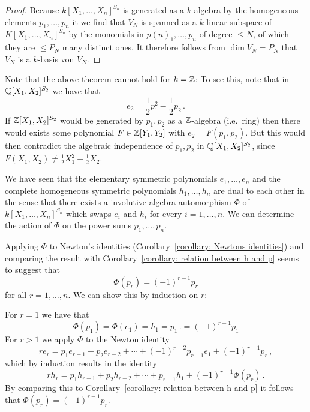 \begin{proof}
  Because $k[X_1, \dotsc, X_n]^{S_n}$ is generated as a $k$-algebra by the homogeneous elements $p_1, \dotsc, p_n$ it we find that $V_N$ is spanned as a $k$-linear subspace of $K[X_1, \dotsc, X_n]^{S_n}$ by the monomials in $p{(n)}_1, \dotsc, p_n$ of degree $\leq N$, of which they are $\leq P_N$ many distinct ones.
  It therefore follows from $\dim V_N = P_N$ that $V_N$ is a $k$-basis von $V_N$.
\end{proof}


\begin{remark}
  Note that the above theorem cannot hold for $k = \mathbb{Z}$:
  To see this, note that in $\mathbb{Q}[X_1, X_2]^{S_2}$ we have that
  \[
      e_2
    = \frac{1}{2}  p_1^2 - \frac{1}{2} p_2 \,.
  \]
  If $\mathbb{Z}[X_1, X_2]^{S_2}$ would be generated by $p_1, p_2$ as a $\mathbb{Z}$-algebra (i.e.\ ring) then there would exists some polynomial $F \in \mathbb{Z}[Y_1, Y_2]$ with $e_2 = F( p_1, p_2)$.
  But this would then contradict the algebraic independence of $p_1, p_2$ in $\mathbb{Q}[X_1, X_2]^{S_2}$, since $F(X_1, X_2) \neq \frac{1}{2} X_1^2 - \frac{1}{2} X_2$.
\end{remark}


% 


\begin{fluff}
  We have seen that the elementary symmetric polynomials $e_1, \dotsc, e_n$ and the complete homogeneous symmetric polynomials $h_1, \dotsc, h_n$ are dual to each other in the sense that there exists a involutive algebra automorphism $\Phi$ of $k[X_1, \dotsc, X_n]^{S_n}$ which swaps $e_i$ and $h_i$ for every $i = 1, \dotsc, n$.
  We can determine the action of $\Phi$ on the power sums $p_1, \dotsc, p_n$.
  
  Applying $\Phi$ to Newton’s identities (Corollary~\ref{corollary: Newtons identities}) and comparing the result with Corollary~\ref{corollary: relation between h and p} seems to suggest that
  \[
      \Phi(p_r)
    = (-1)^{r-1} p_r
  \]
  for all $r = 1, \dotsc, n$.
  We can show this by induction on $r$:
  
  For $r = 1$ we have that
  \[
      \Phi(p_1)
    = \Phi(e_1)
    = h_1
    = p_1 \,.
    = (-1)^{r-1} p_1
  \]
  For $r > 1$ we apply $\Phi$ to the Newton identity
  \[
      r e_r
    =   p_1 e_{r-1}
      - p_2 e_{r-2}
      + \dotsb
      + (-1)^{r-2}  p_{r-1} e_1
      + (-1)^{r-1}  p_r \,,
  \]
  which by induction results in the identity
  \[
      r h_r
    =   p_1 h_{r-1}
      + p_2 h_{r-2}
      + \dotsb
      + p_{r-1} h_1
      + (-1)^{r-1} \Phi(p_r) \,.
  \]
  By comparing this to Corollary~\ref{corollary: relation between h and p} it follows that $\Phi( p_r ) = (-1)^{r-1} p_r$.
\end{fluff}




